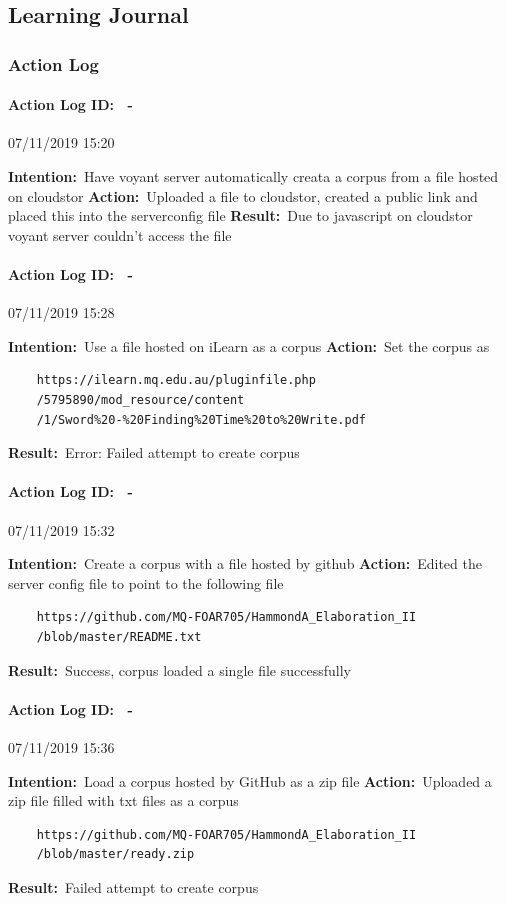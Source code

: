 \documentclass[12pt]{article}
\newcounter{problem} \setcounter{problem}{1}
\newcommand{\actionlog}[1]{\paragraph{Action Log ID: \theproblem\ -}{#1} ~\\ \addtocounter{problem}{1}}
\newcommand{\intention}[1]{\textbf{Intention:}{\textnormal\ #1} \newline}
\newcommand{\action}[1]{\textbf{Action:}{\textnormal\ #1} \newline}
\newcommand{\result}[1]{\textbf{Result:}{\textnormal\ #1} \newline}
\begin{document}
\subsection{Learning Journal}
\subsubsection{Action Log}


\actionlog{07/11/2019 15:20}
\intention{Have voyant server automatically creata a corpus from a file hosted on cloudstor}
\action{Uploaded a file to cloudstor, created a public link and placed this into the serverconfig file}
\result{Due to javascript on cloudstor voyant server couldn't access the file}

\actionlog{07/11/2019 15:28}
\intention{Use a file hosted on iLearn as a corpus}
\action{Set the corpus as}
\begin{verbatim}
    https://ilearn.mq.edu.au/pluginfile.php
    /5795890/mod_resource/content
    /1/Sword%20-%20Finding%20Time%20to%20Write.pdf
\end{verbatim}
\result{Error: Failed attempt to create corpus}

\actionlog{07/11/2019 15:32}
\intention{Create a corpus with a file hosted by github}
\action{Edited the server config file to point to the following file}
\begin{verbatim}
    https://github.com/MQ-FOAR705/HammondA_Elaboration_II
    /blob/master/README.txt
\end{verbatim}
\result{Success, corpus loaded a single file successfully}

\actionlog{07/11/2019 15:36}
\intention{Load a corpus hosted by GitHub as a zip file}
\action{Uploaded a zip file filled with txt files as a corpus}
\begin{verbatim}
    https://github.com/MQ-FOAR705/HammondA_Elaboration_II
    /blob/master/ready.zip
\end{verbatim}
\result{Failed attempt to create corpus}
\end{document}
